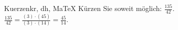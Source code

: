 \begin{MAufgabe}{Kuerzen}{kr, dh, MaTeX}
K\"urzen Sie soweit m\"oglich: $\frac{135}{42}$.\\ 
\ifLsg\MLoesung
\quad $\frac{135}{42}=\frac{(3)\cdot(45)}{(3)\cdot(14)}=\frac{45}{14}$.\else\relax\fi
 \end{MAufgabe}